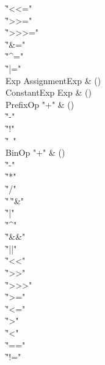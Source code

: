 \begin{bbgrammar}

    \| \xcd"<<="\\
    \| \xcd">>="\\
    \| \xcd">>>="\\
    \| \xcd"&="\\
    \| \xcd"^="\\
    \| \xcd"|="\\
 Exp  \label{prod:Exp}  \: AssignmentExp & ()\\
 ConstantExp  \label{prod:ConstantExp}  \: Exp & ()\\
 PrefixOp  \label{prod:PrefixOp}  \: \xcd"+" & ()\\
    \| \xcd"-"\\
    \| \xcd"!"\\
    \| \xcd"~"\\
 BinOp  \label{prod:BinOp}  \: \xcd"+" & ()\\
    \| \xcd"-"\\
    \| \xcd"*"\\
    \| \xcd"/"\\
    \| \xcd"%
    \| \xcd"&"\\
    \| \xcd"|"\\
    \| \xcd"^"\\
    \| \xcd"&&"\\
    \| \xcd"||"\\
    \| \xcd"<<"\\
    \| \xcd">>"\\
    \| \xcd">>>"\\
    \| \xcd">="\\
    \| \xcd"<="\\
    \| \xcd">"\\
    \| \xcd"<"\\
    \| \xcd"=="\\
    \| \xcd"!="\\
\end{bbgrammar}

\iffalse

abstract       false          offers         transient      
as             final          operator       true           
assert         finally        package        try            
async          finish         private        var            
ateach         for            property       when           
break          goto           protected      while          
case           if             public         at             
catch          implements     return         atomic         
class          import         self           await          
continue       in             static         clocked        
def            instanceof     struct         here           
default        interface      super          next           
do             native         switch         offer          
else           new            this           resume         
extends        null           throw          type           

\fi

